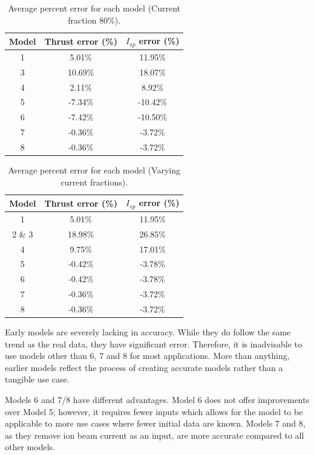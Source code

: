 \documentclass[letterpaper, 10 pt, conference]{ieeeconf}  %
\begin{document}
\begin{table}[H]
\centering
\begin{tabular}{ |c|c|c| }
 \hline
    Model & Thrust error (\%)  & $I_{sp}$ error (\%) \\
    \hline 
    \hline
    1 & 5.01\%  & 11.95\% \\
    \hline   
    3 & 10.69\%  & 18.07\% \\
    \hline   
    4 & 2.11\%  & 8.92\% \\
    \hline   
    5 & -7.34\%  & -10.42\% \\
    \hline   
    6 & -7.42\%  & -10.50\% \\
    \hline   
    7 & -0.36\%  & -3.72\% \\
    \hline   
    8 & -0.36\%  & -3.72\% \\
    \hline 
\end{tabular}
\caption{Average percent error for each model (Current fraction 80\%).}
\end{table}

\begin{table}[H]
\centering
\begin{tabular}{ |c|c|c| }
\hline
    Model & Thrust error (\%)  & $I_{sp}$ error (\%) \\
    \hline
    \hline
    1 & 5.01\%  & 11.95\% \\
    \hline   
    2 \& 3 & 18.98\%  & 26.85\% \\
    \hline   
    4 & 9.75\%  & 17.01\% \\
    \hline   
    5 & -0.42\%  & -3.78\% \\
    \hline   
    6 & -0.42\%  & -3.78\% \\
    \hline   
    7 & -0.36\%  & -3.72\% \\
    \hline  
    8 & -0.36\%  & -3.72\% \\
    \hline  
\end{tabular}
\par    
\caption{Average percent error for each model (Varying current fractions).}
\end{table}

Early models are severely lacking in accuracy. While they do follow the same trend as the real data, they have significant error. Therefore, it is inadvisable to use models other than 6, 7 and 8 for most applications. More than anything, earlier models reflect the process of creating accurate models rather than a tangible use case. 

Models 6 and 7/8 have different advantages. Model 6 does not offer improvements over Model 5; however, it requires fewer inputs which allows for the model to be applicable to more use cases where fewer initial data are known. Models 7 and 8, as they remove ion beam current as an input, are more accurate compared to all other models.
\end{document}
